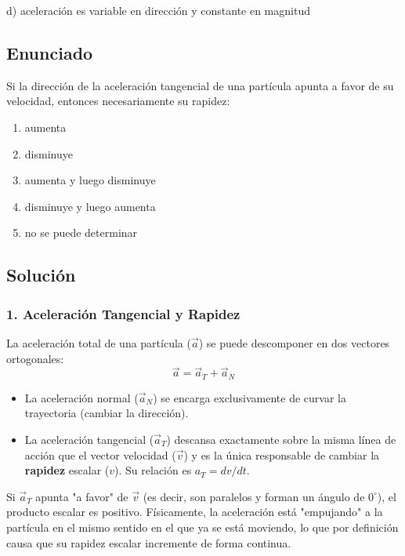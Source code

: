 \documentclass[12pt, a4paper]{article}
\begin{document}
\begin{tcolorbox}[colback=green!5!white, colframe=green!50!black, title=Respuesta Final]
\centering \Large d) aceleración es variable en dirección y constante en magnitud
\end{tcolorbox}

\newpage

\subsection*{Enunciado}
Si la dirección de la aceleración tangencial de una partícula apunta a favor de su velocidad, entonces necesariamente su rapidez:
\begin{enumerate}[label=\alph*)]
    \item aumenta
    \item disminuye
    \item aumenta y luego disminuye
    \item disminuye y luego aumenta
    \item no se puede determinar
\end{enumerate}

\subsection*{Solución}

\subsubsection*{1. Aceleración Tangencial y Rapidez}
La aceleración total de una partícula ($\vec{a}$) se puede descomponer en dos vectores ortogonales:
$$ \vec{a} = \vec{a}_T + \vec{a}_N $$
\begin{itemize}
    \item La aceleración normal ($\vec{a}_N$) se encarga exclusivamente de curvar la trayectoria (cambiar la dirección).
    \item La aceleración tangencial ($\vec{a}_T$) descansa exactamente sobre la misma línea de acción que el vector velocidad ($\vec{v}$) y es la única responsable de cambiar la \textbf{rapidez} escalar ($v$). Su relación es $a_T = dv/dt$.
\end{itemize}

Si $\vec{a}_T$ apunta "a favor" de $\vec{v}$ (es decir, son paralelos y forman un ángulo de $0^\circ$), el producto escalar es positivo. Físicamente, la aceleración está "empujando" a la partícula en el mismo sentido en el que ya se está moviendo, lo que por definición causa que su rapidez escalar incremente de forma continua.
\end{document}
